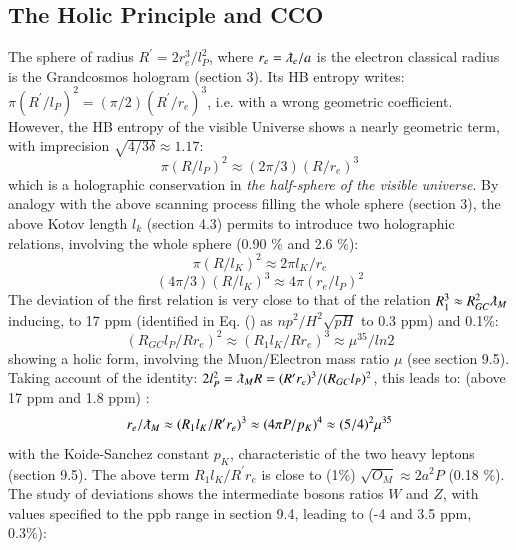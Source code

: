 \documentclass[twoside,draft]{article}
\begin{document}
\begin{sloppypar}
\subsection{The Holic Principle and CCO}

The sphere of radius $R^{\prime} = 2r_e^3 / l_P^ 2$, where $r_e = \lambdabar_e /a $ is the electron classical radius is the Grandcosmos hologram (section 3). Its HB entropy writes: $\pi (R^{\prime}/l_P)^2 = (\pi /2)(R^{\prime}/r_e)^3 $, i.e. with a wrong geometric coefficient. However, the HB entropy of the visible Universe shows a nearly geometric term, with imprecision $\sqrt{4/3\delta} \approx 1.17$:
\begin{equation}
\pi(R/l_P)^2 \approx (2\pi/3)(R/r_e)^3 
\end{equation}
which is a holographic conservation in \textit{the half-sphere of the visible universe}. By analogy with the above scanning process filling the whole sphere (section 3), the above Kotov length $l_k$ (section 4.3) permits to introduce two holographic relations, involving the whole sphere (0.90 \% and 2.6 \%):
\begin{equation}
\pi(R/l_K)^2 \approx 2\pi l_K/r_e 
\end{equation}
\begin{equation}
(4\pi/3)(R/l_K)^3 \approx 4\pi (r_e/l_P)^2 
\end{equation}
The deviation of the first relation is very close to that of the relation $R_1^3 \approx R_{GC}^2 \lambdabar_M$ inducing, to 17 ppm (identified in Eq. () as $np^2/H^2\sqrt{pH}$ to 0.3 ppm) and 0.1\%: 
\begin{equation}
 (R_{GC}l_P/Rr_e)^2 \approx (R_1l_K/Rr_e)^3 \approx \mu^{35}/ln2
\end{equation}
showing a holic form, involving the Muon/Electron mass ratio $\mu$ (see section 9.5).
Taking account of the identity: $2l_P^2 = \lambdabar_M R = (R^{\prime}r_e)^3/(R_{GC}l_P)^2$, this leads to:  (above 17 ppm and 1.8 ppm) :
\begin{equation}
r_e/\lambdabar_M \approx (R_1l_K/R^{\prime}r_e)^3 \approx (4\pi P/p_K)^4
\approx (5/4)^2 \mu ^{35} \end{equation}
with the Koide-Sanchez constant $p_K$, characteristic of the two heavy leptons (section 9.5).
The above term $R_1l_K/R^{\prime}r_e$ is close to (1\%) $\sqrt{O_M} \approx 2a^2P$ (0.18 \%). The study of deviations shows the intermediate bosons ratios $W$ and $Z$, with values specified to the ppb range in section 9.4, leading to (-4 and 3.5 ppm, 0.3\%):
\begin{equation}

\end{equation}
\end{sloppypar}
\end{document}
